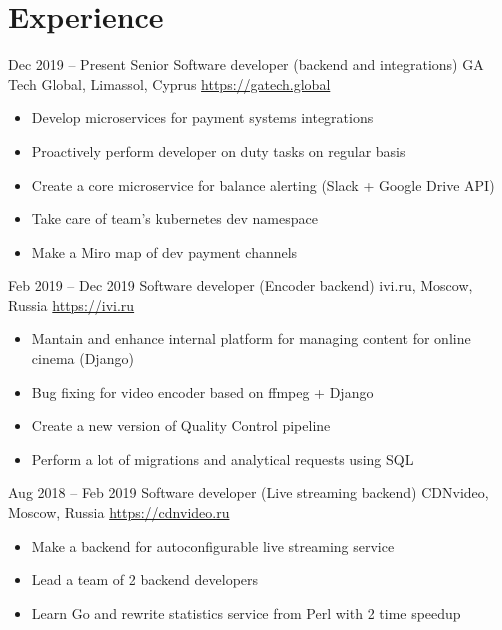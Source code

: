 \documentclass[11pt,a4paper]{moderncv}
\begin{document}
\maketitle
\vspace*{-5mm}

\section{Experience}
  \cventry
    {Dec 2019 – Present}
    {Senior Software developer (backend and integrations)}
    {GA Tech Global, Limassol, Cyprus}
    {\url{https://gatech.global}}
    {}
    {
      \begin{itemize}\setlength\itemindent{6pt}
        \item Develop microservices for payment systems integrations
        \item Proactively perform developer on duty tasks on regular basis
        \item Create a core microservice for balance alerting (Slack + Google Drive API)
        \item Take care of team's kubernetes dev namespace
        \item Make a Miro map of dev payment channels
      \end{itemize}
    }

  \cventry
    {Feb 2019 – Dec 2019}
    {Software developer (Encoder backend)}
    {ivi.ru, Moscow, Russia}
    {\url{https://ivi.ru}}
    {}
    {
      \begin{itemize}\setlength\itemindent{6pt}
        \item Mantain and enhance internal platform for managing content for online cinema (Django)
        \item Bug fixing for video encoder based on ffmpeg + Django
        \item Create a new version of Quality Control pipeline
        \item Perform a lot of migrations and analytical requests using SQL
      \end{itemize}
    }

  \cventry
    {Aug 2018 – Feb 2019}
    {Software developer (Live streaming backend)}
    {CDNvideo, Moscow, Russia}
    {\url{https://cdnvideo.ru}}
    {}
    {
      \begin{itemize}\setlength\itemindent{6pt}
        \item Make a backend for autoconfigurable live streaming service
        \item Lead a team of 2 backend developers
        \item Learn Go and rewrite statistics service from Perl with 2 time speedup
      \end{itemize}
    }
\end{document}
